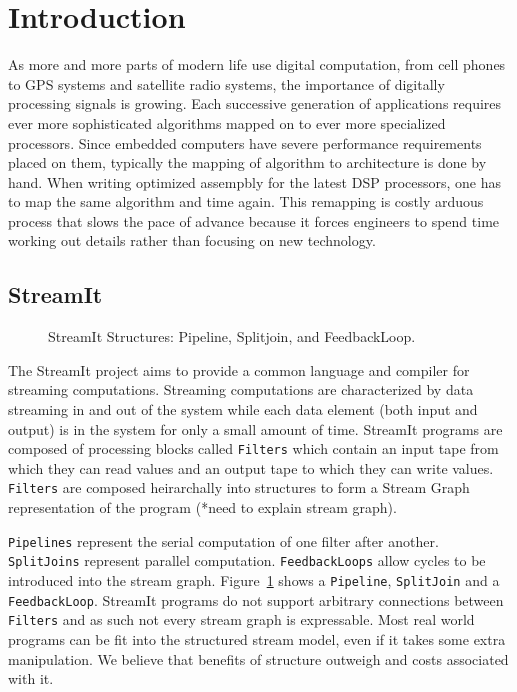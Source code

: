 \section{Introduction}
As more and more parts of modern life use digital computation, from cell phones to GPS systems
and satellite radio systems, the importance of digitally processing signals is growing.
Each successive generation of applications requires ever more sophisticated algorithms mapped 
on to ever more specialized processors. Since embedded computers have severe performance
requirements placed on them, typically the mapping of algorithm to architecture is done by hand.
When writing optimized assempbly for the latest DSP processors, one has to map the same algorithm
and time again. This remapping is costly arduous process that slows the pace of advance
because it forces engineers to spend time working out details rather than focusing on new technology.

\subsection{StreamIt}
\begin{figure}
\center
\epsfxsize=2.5in
\caption{StreamIt Structures: Pipeline, Splitjoin, and FeedbackLoop.}
\label{fig:structures}
\end{figure}

The StreamIt\cite{thies02streamit,thies01streamit,william-stream,michal-common} project
aims to provide a common language and compiler for streaming computations. Streaming computations
are characterized by data streaming in and out of the system while each data element (both
input and output) is in the system for only a small amount of time. 
StreamIt programs are composed of processing blocks called {\tt Filters} which
contain an input tape from which they can read values and an output tape to which
they can write values. {\tt Filters} are composed heirarchally into structures to form
a Stream Graph representation of the program (*need to explain stream graph).
 
{\tt Pipelines} represent the serial computation of one filter after another.
{\tt SplitJoins} represent parallel computation. {\tt FeedbackLoops} allow cycles
to be introduced into the stream graph. Figure~\ref{fig:structures} shows a {\tt Pipeline},
{\tt SplitJoin} and a {\tt FeedbackLoop}. StreamIt programs do not support arbitrary connections
between {\tt Filters} and as such not every stream graph is expressable. Most real world programs
can be fit into the structured stream model, even if it takes some extra manipulation. We believe
that benefits of structure outweigh and costs associated with it.

